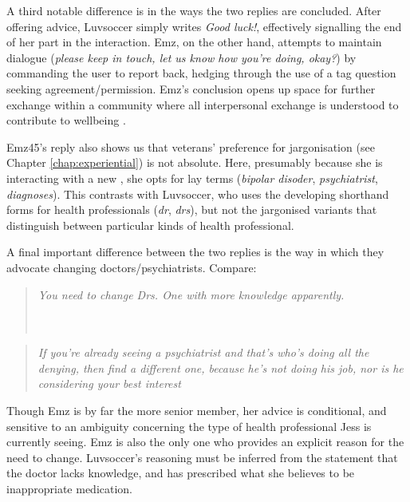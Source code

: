 A third notable difference is in the ways the two replies are concluded. After offering advice, Luvsoccer simply writes \emph{Good luck!}, effectively signalling the end of her part in the interaction. Emz, on the other hand, attempts to maintain dialogue (\emph{please keep in touch, let us know how you're doing, okay?}) by commanding the user to report back, hedging through the use of a tag question seeking agreement\slash permission. Emz's conclusion opens up space for further exchange within a community where all interpersonal exchange is understood to contribute to wellbeing \parencite[c.f.][]{althoff_counseling_2016}.

Emz45's reply also shows us that veterans' preference for jargonisation (see Chapter \ref{chap:experiential}) is not absolute. Here, presumably because she is interacting with a new , she opts for lay terms (\emph{bipolar disoder}, \emph{psychiatrist}, \emph{diagnoses}). This contrasts with Luvsoccer, who uses the developing shorthand forms for health professionals (\emph{dr}, \emph{drs}), but not the jargonised variants that distinguish between particular kinds of health professional.

A final important difference between the two replies is the way in which they advocate changing doctors\slash psychiatrists. Compare:

\begin{multicols}{2}
\begin{quote}

\emph{You need to change Drs. One with more knowledge apparently.} ~\\~\\~\\
\end{quote}

\begin{quote}

\emph{If you're already seeing a psychiatrist and that's who's doing all the denying, then find a different one, because he's not doing his job, nor is he considering your best interest}
\end{quote}
\end{multicols}
%
\noindent Though Emz is by far the more senior member, her advice is conditional, and sensitive to an ambiguity concerning the type of health professional Jess is currently seeing. Emz is also the only one who provides an explicit reason for the need to change. Luvsoccer's reasoning must be inferred from the statement that the doctor lacks knowledge, and has prescribed what she believes to be inappropriate medication. 

